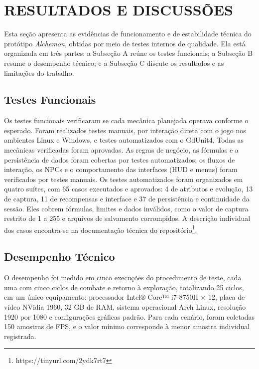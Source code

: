 
\section{RESULTADOS E DISCUSSÕES}
\label{sec:resultados}
Esta seção apresenta as evidências de funcionamento e de estabilidade técnica do protótipo \textit{Alchemon}, obtidas por meio de testes internos de qualidade. Ela está organizada em três partes: a Subseção A reúne os testes funcionais; a Subseção B resume o desempenho técnico; e a Subseção C discute os resultados e as limitações do trabalho.

\subsection{Testes Funcionais}
Os testes funcionais verificaram se cada mecânica planejada operava conforme o esperado. Foram realizados testes manuais, por interação direta com o jogo nos ambientes Linux e Windows, e testes automatizados com o GdUnit4. Todas as mecânicas verificadas foram aprovadas. As regras de negócio, as fórmulas e a persistência de dados foram cobertas por testes automatizados; os fluxos de interação, os NPCs e o comportamento das interfaces (HUD e menus) foram verificados por testes manuais.
Os testes automatizados foram organizados em quatro suítes, com 65 casos executados e aprovados: 4 de atributos e evolução, 13 de captura, 11 de recompensas e interface e 37 de persistência e continuidade da sessão. Eles cobrem fórmulas, limites e dados inválidos, como o valor de captura restrito de 1 a 255 e arquivos de salvamento corrompidos. A descrição individual dos casos encontra-se na documentação técnica do repositório\footnote{https://tinyurl.com/2ydk7rt7}.

\subsection{Desempenho Técnico}
O desempenho foi medido em cinco execuções do procedimento de teste, cada uma com cinco ciclos de combate e retorno à exploração, totalizando 25 ciclos, em um único equipamento: processador Intel® Core™ i7-8750H × 12, placa de vídeo NVidia 1960, 32 GB de RAM, sistema operacional Arch Linux, resolução 1920 por 1080 e configurações gráficas padrão. Para cada cenário, foram coletadas 150 amostras de FPS, e o valor mínimo corresponde à menor amostra individual registrada. 

